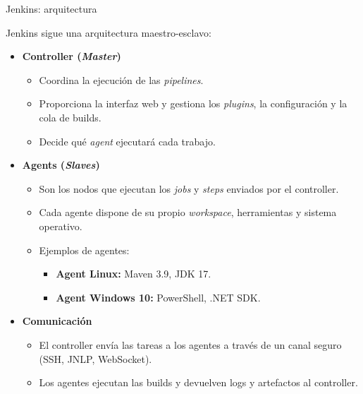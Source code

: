 \documentclass{beamer}
\begin{document}
\begin{frame}{Jenkins: arquitectura}

Jenkins sigue una arquitectura maestro-esclavo:

\begin{itemize}
    \item \textbf{Controller (\textit{Master})}
    \begin{itemize}
        \item Coordina la ejecución de las \textit{pipelines}.
        \item Proporciona la interfaz web y gestiona los \textit{plugins}, la configuración y la cola de builds.
        \item Decide qué \textit{agent} ejecutará cada trabajo.
    \end{itemize}

\pause
    \item \textbf{Agents (\textit{Slaves})}
    \begin{itemize}
        \item Son los nodos que ejecutan los \textit{jobs} y \textit{steps} enviados por el controller.
        \item Cada agente dispone de su propio \textit{workspace}, herramientas y sistema operativo.
        \item Ejemplos de agentes:
        \begin{itemize}
            \item \textbf{Agent Linux:} Maven 3.9, JDK 17.
            \item \textbf{Agent Windows 10:} PowerShell, .NET SDK.
        \end{itemize}
    \end{itemize}

    \pause

    \item \textbf{Comunicación}
    \begin{itemize}
        \item El controller envía las tareas a los agentes a través de un canal seguro (SSH, JNLP, WebSocket).
        \item Los agentes ejecutan las builds y devuelven logs y artefactos al controller.
    \end{itemize}
\end{itemize}



    
\end{frame}
\end{document}
